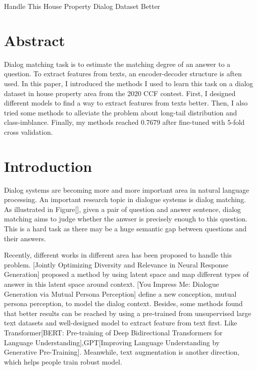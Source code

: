 \documentclass{article}%
\begin{document}
%
\normalsize%
%
Handle This House Property Dialog Dataset Better%

%
\section{Abstract}%

%
Dialog matching task is to estimate the matching degree of an answer to a question. To extract features from texts, an encoder{-}decoder structure is aften used. In this paper, I introduced the methods I used to learn this task on a dialog dataset in house property area from the 2020 CCF contest. First, I designed different models to find a way to extract features from texts better. Then, I also tried some methods to alleviate the problem about long{-}tail distribution and class{-}imblance. Finally, my methods reached 0.7679 after fine{-}tuned with 5{-}fold cross validation.%

%

%
\section{Introduction}%

%
Dialog systems are becoming more and more important area in natural language processing. An important research topic in dialogue systems is dialog matching. As illustrated in Figure{[}{]}, given a pair of question and answer sentence, dialog matching aims to judge whether the anwser is precisely enough to this question. This is a hard task as there may be a huge semantic gap between questions and their answers.%

%
Recently, different works in different area has been proposed to handle this problem. {[}Jointly Optimizing Diversity and Relevance in Neural Response Generation{]} proposed a method by using latent space and map different types of answer in this latent space around context. {[}You Impress Me: Dialogue Generation via Mutual Persona Perception{]} define a new conception, mutual persona perception, to model the dialog context. Besides, some methods found that better results can be reached by using a pre{-}trained from unsupervised large text datasets and well{-}designed model to extract feature from text first. Like Transformer{[}BERT: Pre{-}training of Deep Bidirectional Transformers for Language Understanding{]},GPT{[}Improving Language Understanding by Generative Pre{-}Training{]}. Meanwhile, text augmentation is another direction, which helps people train robust model.%
\end{document}
